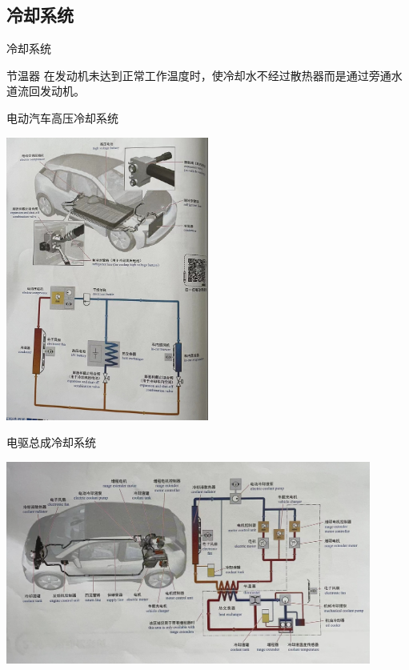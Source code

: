 \subsection{冷却系统}
\begin{frame}{冷却系统}
	\begin{block}{节温器}
		在发动机未达到正常工作温度时，使冷却水不经过散热器而是通过旁通水道流回发动机。
	\end{block}
\end{frame}
\begin{frame}
	\begin{block}{电动汽车高压冷却系统}
		\begin{center}
			\includegraphics[width=0.5\textwidth]{2-38}
		\end{center}
	\end{block}
\end{frame}
\begin{frame}
	\begin{block}{电驱总成冷却系统}
		\begin{center}
			\includegraphics[width=0.9\textwidth]{2-39}
		\end{center}
	\end{block}
\end{frame}
